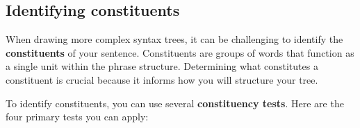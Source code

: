 \ea {}\label{tree:veryhappyaboutit}
\z

\subsection{Identifying constituents}\label{sec:identifying_constituents}

When drawing more complex syntax trees, it can be challenging to identify the \textbf{constituents} of your sentence. Constituents are groups of words that function as a single unit within the phrase structure. Determining what constitutes a constituent is crucial because it informs how you will structure your tree.

To identify constituents, you can use several \textbf{constituency tests}. Here are the four primary tests you can apply:

